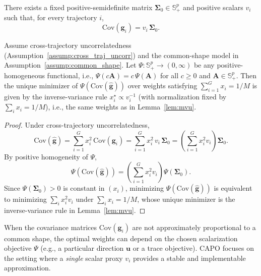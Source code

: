 \begin{assumption}\label{assump:common_shape}
There exists a fixed positive-semidefinite matrix $\boldsymbol{\Sigma}_0\in\mathbb{S}_{+}^{p}$ and positive scalars $v_i$ such that, for every trajectory $i$,
\[
\mathrm{Cov}(\boldsymbol{g}_i)=v_i\,\boldsymbol{\Sigma}_0.
\]
\end{assumption}

\begin{proposition}\label{prop:common_shape_weights}
Assume cross-trajectory uncorrelatedness (Assumption~\ref{assump:cross_traj_uncorr}) and the common-shape model in Assumption~\ref{assump:common_shape}.
Let $\Psi:\mathbb{S}_{+}^{p}\to(0,\infty)$ be any positive-homogeneous functional, i.e.,
$\Psi(c\boldsymbol{A})=c\,\Psi(\boldsymbol{A})$ for all $c\ge 0$ and $\boldsymbol{A}\in\mathbb{S}_{+}^{p}$.
Then the unique minimizer of $\Psi(\mathrm{Cov}(\widehat{\boldsymbol{g}}))$ over weights satisfying $\sum_{i=1}^G x_i=1/M$ is given by the inverse-variance rule
$x_i^\star\propto v_i^{-1}$ (with normalization fixed by $\sum_i x_i=1/M$), i.e., the same weights as in Lemma~\ref{lem:mvu}.
\end{proposition}

\begin{proof}
Under cross-trajectory uncorrelatedness,
\[
\mathrm{Cov}(\widehat{\boldsymbol{g}})
=\sum_{i=1}^G x_i^2\,\mathrm{Cov}(\boldsymbol{g}_i)
=\sum_{i=1}^G x_i^2\,v_i\,\boldsymbol{\Sigma}_0
=\left(\sum_{i=1}^G x_i^2 v_i\right)\boldsymbol{\Sigma}_0.
\]
By positive homogeneity of $\Psi$,
\[
\Psi\!\left(\mathrm{Cov}(\widehat{\boldsymbol{g}})\right)
=\left(\sum_{i=1}^G x_i^2 v_i\right)\Psi(\boldsymbol{\Sigma}_0).
\]
Since $\Psi(\boldsymbol{\Sigma}_0)>0$ is constant in $(x_i)$, minimizing $\Psi(\mathrm{Cov}(\widehat{\boldsymbol{g}}))$ is equivalent to minimizing
$\sum_i x_i^2 v_i$ under $\sum_i x_i=1/M$, whose unique minimizer is the inverse-variance rule in Lemma~\ref{lem:mvu}.
\end{proof}

\begin{remark}
When the covariance matrices $\mathrm{Cov}(\boldsymbol{g}_i)$ are not approximately proportional to a common shape,
the optimal weights can depend on the chosen scalarization objective $\Psi$ (e.g., a particular direction $\bm{u}$ or a trace objective).
CAPO focuses on the setting where a \emph{single} scalar proxy $v_i$ provides a stable and implementable approximation.
\end{remark}

